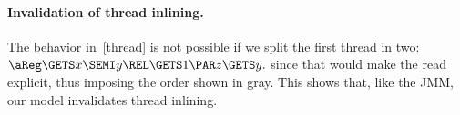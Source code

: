 \paragraph*{Invalidation of thread inlining. }
The behavior in~\ref{thread} is not possible if we split the first
thread in two:
\begin{math}
  \aReg\GETS x\SEMI
  y\REL\GETS 1\PAR
  z\GETS y.
\end{math}
since that would make the read explicit, thus imposing the order
shown in gray.   This shows that, like the JMM, our model invalidates thread
inlining.


